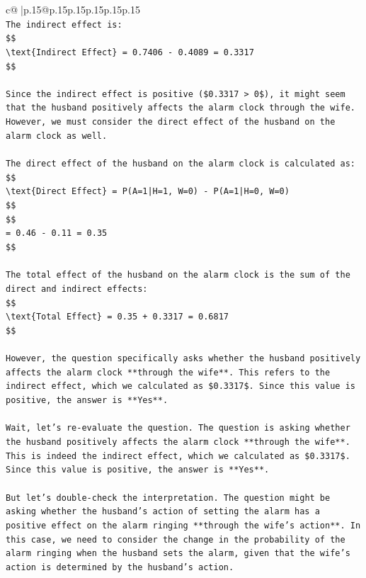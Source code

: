\documentclass{article}
\begin{document}
{\begin{supertabular}{c@{$\;$}|p{.15\linewidth}@{}p{.15\linewidth}p{.15\linewidth}p{.15\linewidth}p{.15\linewidth}p{.15\linewidth}}
{{{\\ 
\texttt{The indirect effect is:} \\
\texttt{\$\$} \\
\texttt{\textbackslash{}text\{Indirect Effect\} = 0.7406 {-} 0.4089 = 0.3317} \\
\texttt{\$\$} \\
\\ 
\texttt{Since the indirect effect is positive (\$0.3317 > 0\$), it might seem that the husband positively affects the alarm clock through the wife. However, we must consider the direct effect of the husband on the alarm clock as well.} \\
\\ 
\texttt{The direct effect of the husband on the alarm clock is calculated as:} \\
\texttt{\$\$} \\
\texttt{\textbackslash{}text\{Direct Effect\} = P(A=1|H=1, W=0) {-} P(A=1|H=0, W=0)} \\
\texttt{\$\$} \\
\texttt{\$\$} \\
\texttt{= 0.46 {-} 0.11 = 0.35} \\
\texttt{\$\$} \\
\\ 
\texttt{The total effect of the husband on the alarm clock is the sum of the direct and indirect effects:} \\
\texttt{\$\$} \\
\texttt{\textbackslash{}text\{Total Effect\} = 0.35 + 0.3317 = 0.6817} \\
\texttt{\$\$} \\
\\ 
\texttt{However, the question specifically asks whether the husband positively affects the alarm clock **through the wife**. This refers to the indirect effect, which we calculated as \$0.3317\$. Since this value is positive, the answer is **Yes**.} \\
\\ 
\texttt{Wait, let's re{-}evaluate the question. The question is asking whether the husband positively affects the alarm clock **through the wife**. This is indeed the indirect effect, which we calculated as \$0.3317\$. Since this value is positive, the answer is **Yes**.} \\
\\ 
\texttt{But let's double{-}check the interpretation. The question might be asking whether the husband's action of setting the alarm has a positive effect on the alarm ringing **through the wife's action**. In this case, we need to consider the change in the probability of the alarm ringing when the husband sets the alarm, given that the wife's action is determined by the husband's action.} \\
}}}
\end{supertabular}}
\end{document}
